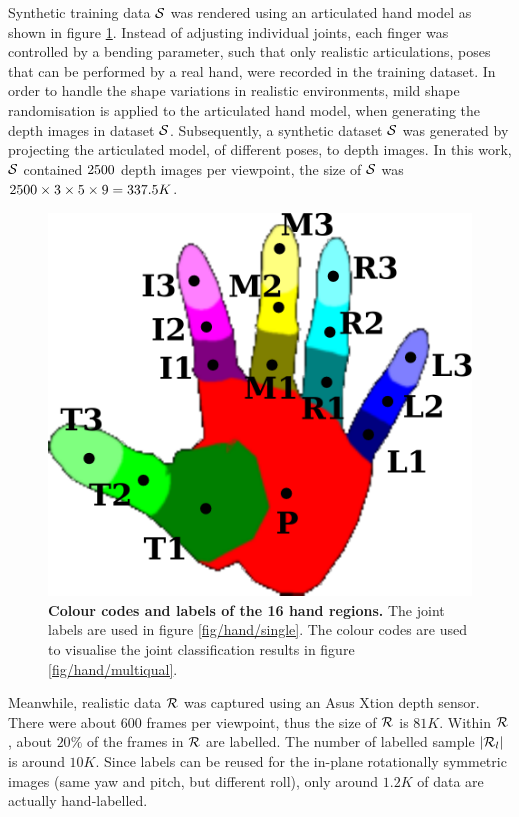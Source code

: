 Synthetic training data $\mathcal{S}$ was rendered using an articulated hand model as shown in figure \ref{fig/hand/label}. 
Instead of adjusting individual joints, each finger was controlled by a bending parameter, such that only realistic articulations, \ie poses that can be performed by a real hand, were recorded in the training dataset. 
In order to handle the shape variations in realistic environments, mild shape randomisation is applied to the articulated hand model, when generating the depth images in dataset $\mathcal{S}$. 
Subsequently, a synthetic dataset $\mathcal{S}$ was generated by projecting the articulated model, of different poses, to depth images. In this work, $\mathcal{S}$ contained $2500$ depth images per viewpoint, the size of $\mathcal{S}$ was $2500 \times 3 \times 5 \times 9 = 337.5K$.  

\begin{figure}[ht]
	\centering
	\includegraphics[width=0.32\linewidth]{fig/hand/hand.pdf}
	\caption{\textbf{Colour codes and labels of the 16 hand regions.} The joint labels are used in figure \ref{fig/hand/single}. The colour codes are used to visualise the joint classification results in figure \ref{fig/hand/multiqual}.}
	\label{fig/hand/label}
\end{figure}

Meanwhile, realistic data $\mathcal{R}$ was captured using an Asus Xtion depth sensor. 
There were about $600$ frames per viewpoint, thus the size of $\mathcal{R}$ is $81K$. 
Within $\mathcal{R}$, about $20\%$ of the frames in $\mathcal{R}$ are labelled. 
The number of labelled sample $|\mathcal{R}_{l}|$ is around $10K$.    
Since labels can be reused for the in-plane rotationally symmetric images (same yaw and pitch, but different roll), only around $1.2K$ of data are actually hand-labelled.    


